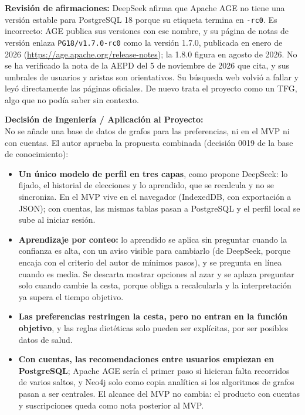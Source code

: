 \textbf{Revisión de afirmaciones:} DeepSeek afirma que Apache AGE no tiene una versión estable para PostgreSQL 18 porque su etiqueta termina en \texttt{-rc0}. Es incorrecto: AGE publica sus versiones con ese nombre, y su página de notas de versión enlaza \texttt{PG18/v1.7.0-rc0} como la versión 1.7.0, publicada en enero de 2026 (\url{https://age.apache.org/release-notes}); la 1.8.0 figura en agosto de 2026. No se ha verificado la nota de la AEPD del 5 de noviembre de 2026 que cita, y sus umbrales de usuarios y aristas son orientativos. Su búsqueda web volvió a fallar y leyó directamente las páginas oficiales. De nuevo trata el proyecto como un TFG, algo que no podía saber sin contexto.

\textbf{Decisión de Ingeniería / Aplicación al Proyecto:} \\
No se añade una base de datos de grafos para las preferencias, ni en el MVP ni con cuentas. El autor aprueba la propuesta combinada (decisión 0019 de la base de conocimiento):

\begin{itemize}
	\item \textbf{Un único modelo de perfil en tres capas}, como propone DeepSeek: lo fijado, el historial de elecciones y lo aprendido, que se recalcula y no se sincroniza. En el MVP vive en el navegador (IndexedDB, con exportación a JSON); con cuentas, las mismas tablas pasan a PostgreSQL y el perfil local se sube al iniciar sesión.
	\item \textbf{Aprendizaje por conteo:} lo aprendido se aplica sin preguntar cuando la confianza es alta, con un aviso visible para cambiarlo (de DeepSeek, porque encaja con el criterio del autor de mínimos pasos), y se pregunta en línea cuando es media. Se descarta mostrar opciones al azar y se aplaza preguntar solo cuando cambie la cesta, porque obliga a recalcularla y la interpretación ya supera el tiempo objetivo.
	\item \textbf{Las preferencias restringen la cesta, pero no entran en la función objetivo}, y las reglas dietéticas solo pueden ser explícitas, por ser posibles datos de salud.
	\item \textbf{Con cuentas, las recomendaciones entre usuarios empiezan en PostgreSQL}; Apache AGE sería el primer paso si hicieran falta recorridos de varios saltos, y Neo4j solo como copia analítica si los algoritmos de grafos pasan a ser centrales. El alcance del MVP no cambia: el producto con cuentas y suscripciones queda como nota posterior al MVP.
\end{itemize}

